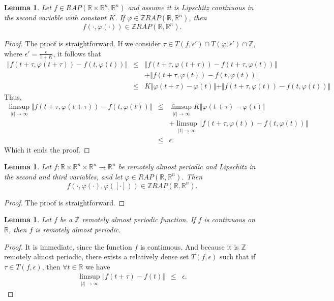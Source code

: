 \documentclass[english,,reqno]{amsart}
\numberwithin{equation}{section}
\theoremstyle{plain}
\newtheorem{lem}[thm]{Lemma}
\theoremstyle{definition}
\theoremstyle{remark}
\begin{document}
\begin{lem}
Let $f \in RAP(\mathbb{R} \times \mathbb{R}^n, \mathbb{R}^n)$ and assume it is Lipschitz continuous in the second variable with constant $K$.  
If $\varphi \in \mathbb{Z}RAP(\mathbb{R}, \mathbb{R}^n)$, then  
\[
f(\cdot, \varphi(\cdot)) \in \mathbb{Z}RAP(\mathbb{R}, \mathbb{R}^n).
\]
\end{lem}
\begin{proof}
The proof is straightforward. If we consider $\tau \in T(f, \epsilon') \cap T(\varphi, \epsilon') \cap \mathbb{Z}$, where $\epsilon' = \frac{\epsilon}{1+K}$, it follows that
\begin{eqnarray*}
\Vert f(t+\tau,\varphi(t+\tau))-f(t,\varphi(t)) \Vert 
&\leq & \Vert f(t+\tau,\varphi(t+\tau))-f(t+\tau,\varphi(t)) \Vert \\
& & +\Vert f(t+\tau,\varphi(t))-f(t,\varphi(t))\Vert\\
&\leq& K\Vert \varphi(t+\tau)-\varphi(t) \Vert + \Vert f(t+\tau,\varphi(t))-f(t,\varphi(t))\Vert
\end{eqnarray*}
Thus,
\begin{eqnarray*}
\limsup_{\vert t \vert \rightarrow\infty} \Vert f(t+\tau,\varphi(t+\tau))-f(t,\varphi(t)) \Vert 
&\leq & \limsup_{\vert t \vert \rightarrow\infty} K\Vert \varphi(t+\tau)-\varphi(t) \Vert \\
& &+ \limsup_{\vert t \vert \rightarrow\infty} \Vert f(t+\tau,\varphi(t))-f(t,\varphi(t))\Vert\\
&\leq & \epsilon.
\end{eqnarray*}
Which it ends the proof.
\end{proof}

\begin{lem}
Let $f:\mathbb{R}\times \mathbb{R}^n\times \mathbb{R}^n \rightarrow \mathbb{R}^n$ be remotely almost periodic and Lipschitz in the second and third variables, and let $\varphi \in RAP(\mathbb{R},\mathbb{R}^n)$. Then  
\[
f(\cdot,\varphi(\cdot),\varphi([\cdot])) \in \mathbb{Z}RAP(\mathbb{R},\mathbb{R}^n).
\]
\end{lem}
\begin{proof}
The proof is straightforward.
\end{proof}

\begin{lem}\label{ZRAP_unif_conti_RAP}
Let $f$ be a $\mathbb{Z}$ remotely almost periodic function. If $f$ is continuous on $\mathbb{R}$, then $f$ is remotely almost periodic.
\end{lem}
\begin{proof}
It is immediate, since the function $f$ is continuous. And because it is $\mathbb{Z}$ remotely almost periodic, there exists a relatively dense set $T(f,\epsilon)$ such that if $\tau \in T(f,\epsilon)$, then $\forall t \in \mathbb{R}$  we have
\begin{eqnarray*}
\limsup_{\vert t\vert \rightarrow \infty} \Vert f(t+\tau)-f(t) \Vert 
&\leq & \epsilon.
\end{eqnarray*}
\end{proof}
\end{document}
